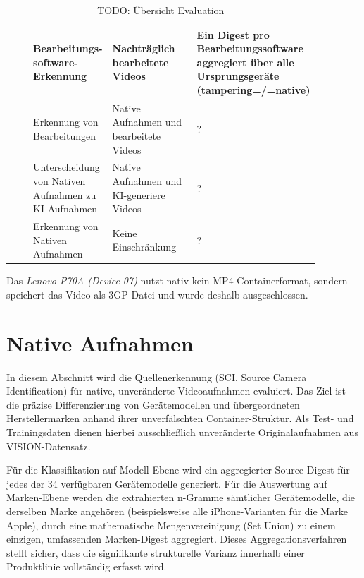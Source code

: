 \begin{table}[!ht]
\begin{threeparttable}
\begin{tabular}{>{\raggedright\arraybackslash}p{0.1\linewidth}>{\raggedright\arraybackslash}p{0.17\linewidth}>{\raggedright\arraybackslash}p{0.3\linewidth}>{\raggedright\arraybackslash}p{0.3\linewidth}}
            & 	
            Bearbeitungs-software-Erkennung& Nachträglich bearbeitete Videos& Ein Digest pro Bearbeitungssoftware aggregiert über alle Ursprungsgeräte (tampering=/=native)\\\hline
            & Erkennung von Bearbeitungen& Native Aufnahmen und bearbeitete Videos& ?\\\hline
            & Unterscheidung von Nativen Aufnahmen zu KI-Aufnahmen& Native Aufnahmen und KI-generiere Videos& ?\\\hline
            & Erkennung von Nativen Aufnahmen& Keine Einschränkung& ?\\ \bottomrule\bottomrule 
        \end{tabular}

        \begin{tablenotes}\scriptsize
            \item[a] Das \textit{Lenovo P70A (Device 07)} nutzt nativ kein MP4-Containerformat, sondern speichert das Video als 3GP-Datei und wurde deshalb ausgeschlossen.
        \end{tablenotes}

        \caption{TODO: Übersicht Evaluation}
        \label{tab:evaluation}
        
    \end{threeparttable}
\end{table}





\section{Native Aufnahmen}

In diesem Abschnitt wird die Quellenerkennung (SCI, Source Camera Identification) für native, unveränderte Videoaufnahmen evaluiert. Das Ziel ist die präzise Differenzierung von Gerätemodellen und übergeordneten Herstellermarken anhand ihrer unverfälschten Container-Struktur. Als Test- und Trainingsdaten dienen hierbei ausschließlich unveränderte Originalaufnahmen aus VISION-Datensatz. 

Für die Klassifikation auf Modell-Ebene wird ein aggregierter Source-Digest für jedes der 34 verfügbaren Gerätemodelle generiert. Für die Auswertung auf Marken-Ebene werden die extrahierten n-Gramme sämtlicher Gerätemodelle, die derselben Marke angehören (beispielsweise alle iPhone-Varianten für die Marke Apple), durch eine mathematische Mengenvereinigung (Set Union) zu einem einzigen, umfassenden Marken-Digest aggregiert. Dieses Aggregationsverfahren stellt sicher, dass die signifikante strukturelle Varianz innerhalb einer Produktlinie vollständig erfasst wird.

